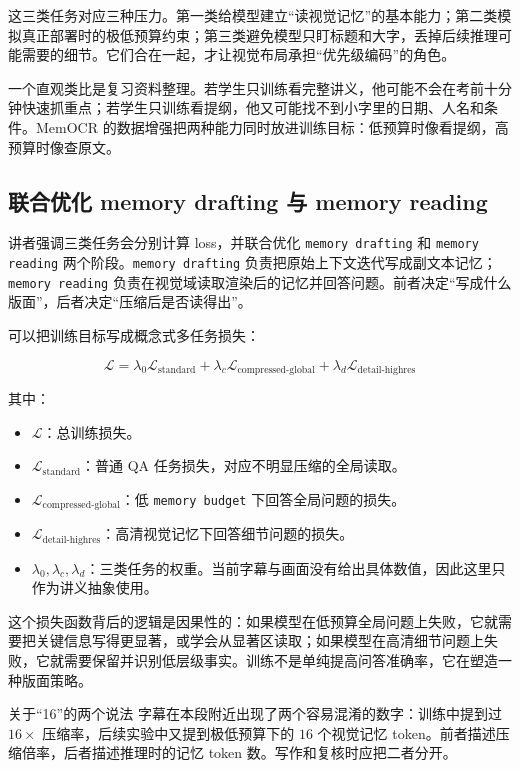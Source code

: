 这三类任务对应三种压力。第一类给模型建立“读视觉记忆”的基本能力；第二类模拟真正部署时的极低预算约束；第三类避免模型只盯标题和大字，丢掉后续推理可能需要的细节。它们合在一起，才让视觉布局承担“优先级编码”的角色。

一个直观类比是复习资料整理。若学生只训练看完整讲义，他可能不会在考前十分钟快速抓重点；若学生只训练看提纲，他又可能找不到小字里的日期、人名和条件。MemOCR 的数据增强把两种能力同时放进训练目标：低预算时像看提纲，高预算时像查原文。

\subsection{联合优化 memory drafting 与 memory reading}

讲者强调三类任务会分别计算 loss，并联合优化 \texttt{memory drafting} 和 \texttt{memory reading} 两个阶段。\texttt{memory drafting} 负责把原始上下文迭代写成副文本记忆；\texttt{memory reading} 负责在视觉域读取渲染后的记忆并回答问题。前者决定“写成什么版面”，后者决定“压缩后是否读得出”。

可以把训练目标写成概念式多任务损失：

$$
\mathcal{L}
= \lambda_0 \mathcal{L}_{\text{standard}}
+ \lambda_c \mathcal{L}_{\text{compressed-global}}
+ \lambda_d \mathcal{L}_{\text{detail-highres}}
$$

其中：

\begin{itemize}
    \item $\mathcal{L}$：总训练损失。
    \item $\mathcal{L}_{\text{standard}}$：普通 QA 任务损失，对应不明显压缩的全局读取。
    \item $\mathcal{L}_{\text{compressed-global}}$：低 \texttt{memory budget} 下回答全局问题的损失。
    \item $\mathcal{L}_{\text{detail-highres}}$：高清视觉记忆下回答细节问题的损失。
    \item $\lambda_0,\lambda_c,\lambda_d$：三类任务的权重。当前字幕与画面没有给出具体数值，因此这里只作为讲义抽象使用。
\end{itemize}

这个损失函数背后的逻辑是因果性的：如果模型在低预算全局问题上失败，它就需要把关键信息写得更显著，或学会从显著区读取；如果模型在高清细节问题上失败，它就需要保留并识别低层级事实。训练不是单纯提高问答准确率，它在塑造一种版面策略。

\begin{warningbox}{关于“16”的两个说法}
字幕在本段附近出现了两个容易混淆的数字：训练中提到过 $16\times$ 压缩率，后续实验中又提到极低预算下的 $16$ 个视觉记忆 token。前者描述压缩倍率，后者描述推理时的记忆 token 数。写作和复核时应把二者分开。
\end{warningbox}

